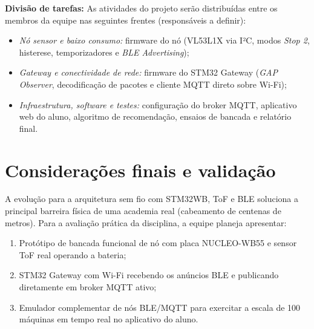 \documentclass[11pt,a4paper]{article}
\begin{document}
\textbf{Divisão de tarefas:} As atividades do projeto serão distribuídas entre os
membros da equipe nas seguintes frentes (responsáveis a definir):
\begin{itemize}
  \item \emph{Nó sensor e baixo consumo:} firmware do nó (VL53L1X via I²C, modos \emph{Stop 2}, histerese, temporizadores e \emph{BLE Advertising});
  \item \emph{Gateway e conectividade de rede:} firmware do STM32 Gateway (\emph{GAP Observer}, decodificação de pacotes e cliente MQTT direto sobre Wi-Fi);
  \item \emph{Infraestrutura, software e testes:} configuração do broker MQTT, aplicativo web do aluno, algoritmo de recomendação, ensaios de bancada e relatório final.
\end{itemize}

\section{Considerações finais e validação}

A evolução para a arquitetura sem fio com STM32WB, ToF e BLE soluciona a principal barreira
física de uma academia real (cabeamento de centenas de metros). Para a avaliação prática da
disciplina, a equipe planeja apresentar:
\begin{enumerate}
  \item Protótipo de bancada funcional de nó com placa NUCLEO-WB55 e sensor ToF real operando
        a bateria;
  \item STM32 Gateway com Wi-Fi recebendo os anúncios BLE e publicando diretamente em broker MQTT ativo;
  \item Emulador complementar de nós BLE/MQTT para exercitar a escala de 100 máquinas em
        tempo real no aplicativo do aluno.
\end{enumerate}
\end{document}
